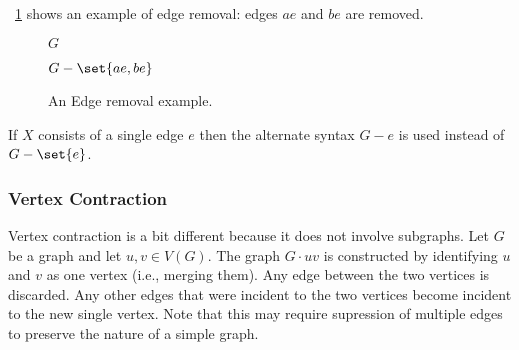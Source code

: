 \figurename~\ref{fig:eremove} shows an example of edge removal: edges \(ae\) and \(be\) are removed.

\begin{figure}[H]
  \begin{minipage}{2.75in}
    \centering

    \(G\)
  \end{minipage}
  \begin{minipage}{2.75in}
    \centering

    \(G-\set{ae,be}\)
  \end{minipage}
  \caption{An Edge removal example.}
  \label{fig:eremove}
\end{figure}

If \(X\) consists of a single edge \(e\) then the alternate syntax \(G-e\) is used instead of \(G-\set{e}\).

\subsubsection{Vertex Contraction}\label{sec:sub:sub:contract}

Vertex contraction is a bit different because it does not involve subgraphs.  Let \(G\) be a graph and let \(u,v\in
V(G)\).  The graph \(G\cdot uv\) is constructed by identifying \(u\) and \(v\) as one vertex (i.e., merging them).
Any edge between the two vertices is discarded.  Any other edges that were incident to the two vertices become
incident to the new single vertex.  Note that this may require supression of multiple edges to preserve the nature
of a simple graph.

